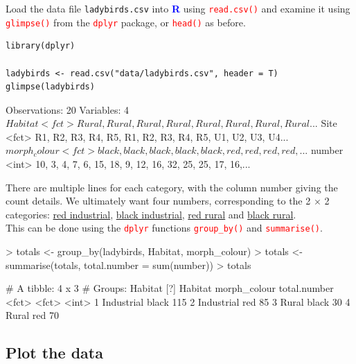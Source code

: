 \documentclass[a4paper,12pt]{article}
\newcommand\boldblue[1]{\textcolor{blue}{\textbf{#1}}}
\newcommand\code[1]{\textcolor{red}{\texttt{#1}}}
\begin{document}
Load the data file \texttt{ladybirds.csv} into \boldblue{R} using \code{read.csv()} and examine it using \code{glimpse()} from the \code{dplyr} package, or \code{head()} as before.

\begin{shaded}
\begin{verbatim}
library(dplyr)

ladybirds <- read.csv("data/ladybirds.csv", header = T)
glimpse(ladybirds)
\end{verbatim}
\begin{Schunk}
\begin{Soutput}
Observations: 20
Variables: 4
$ Habitat      <fct> Rural, Rural, Rural, Rural, Rural, Rural, Rural, Rural...
$ Site         <fct> R1, R2, R3, R4, R5, R1, R2, R3, R4, R5, U1, U2, U3, U4...
$ morph_colour <fct> black, black, black, black, black, red, red, red, red,...
$ number       <int> 10, 3, 4, 7, 6, 15, 18, 9, 12, 16, 32, 25, 25, 17, 16,...
\end{Soutput}
\end{Schunk}
\end{shaded}

There are multiple lines for each category, with the column number giving the count details. We ultimately want four numbers, corresponding to the 2 $\times$ 2 categories: \underline{red industrial}, \underline{black industrial}, \underline{red rural} and \underline{black rural}. \\

This can be done using the \code{dplyr} functions \code{group\_by()} and \code{summarise()}.

\begin{shaded}
\begin{Schunk}
\begin{Sinput}
> totals <- group_by(ladybirds, Habitat, morph_colour)
> totals <- summarise(totals, total.number = sum(number))
> totals
\end{Sinput}
\begin{Soutput}
# A tibble: 4 x 3
# Groups:   Habitat [?]
  Habitat    morph_colour total.number
  <fct>      <fct>               <int>
1 Industrial black                 115
2 Industrial red                    85
3 Rural      black                  30
4 Rural      red                    70
\end{Soutput}
\end{Schunk}
\end{shaded}

\subsection{Plot the data}
\end{document}
